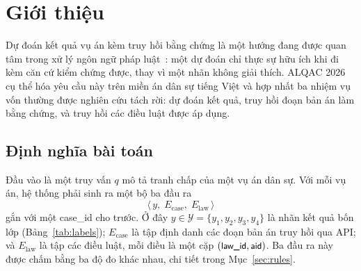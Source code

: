 \documentclass[conference]{IEEEtran}
\newcommand{\field}[1]{\textsf{\small #1}}
\begin{document}


\section{Giới thiệu}
Dự đoán kết quả vụ án kèm truy hồi bằng chứng là một hướng đang được quan tâm
trong xử lý ngôn ngữ pháp luật~\cite{b1,b2}: một dự đoán chỉ thực sự hữu ích khi
đi kèm căn cứ kiểm chứng được, thay vì một nhãn không giải thích. ALQAC 2026 cụ thể hóa
yêu cầu này trên miền án dân sự tiếng Việt và hợp nhất ba nhiệm vụ vốn thường
được nghiên cứu tách rời: dự đoán kết quả, truy hồi đoạn bản án làm bằng chứng,
và truy hồi các điều luật được áp dụng.

\subsection{Định nghĩa bài toán}
Đầu vào là một truy vấn $q$ mô tả tranh chấp của một vụ án dân sự. Với mỗi vụ
án, hệ thống phải sinh ra một bộ ba đầu ra
\[
  \bigl\langle\, y,\; E_{\text{case}},\; E_{\text{law}} \,\bigr\rangle
\]
gắn với một \field{case\_id} cho trước. Ở đây $y \in \mathcal{Y} = \{y_1, y_2,
y_3, y_4\}$ là nhãn kết quả bốn lớp (Bảng~\ref{tab:labels}); $E_{\text{case}}$
là tập định danh các đoạn bản án truy hồi qua API; và $E_{\text{law}}$ là tập
các điều luật, mỗi điều là một cặp $(\field{law\_id}, \field{aid})$. Ba đầu ra
này được chấm bằng ba độ đo khác nhau, chi tiết trong Mục~\ref{sec:rules}.
\end{document}
